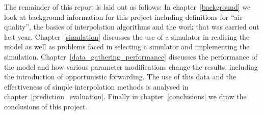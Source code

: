 
    The remainder of this report is laid out as follows: In chapter~\ref{background} we look at background information for this project including definitions for ``air quality'', the basics of interpolation algorithms and the work that was carried out last year. Chapter~\ref{simulation} discusses the use of a simulator in realising the model as well as problems faced in selecting a simulator and implementing the simulation. Chapter~\ref{data_gathering_performance} discusses the performance of the model and how various parameter modifications change the results, including the introduction of opportunistic forwarding. The use of this data and the effectiveness of simple interpolation methods is analysed in chapter~\ref{prediction_evaluation}. Finally in chapter~\ref{conclusions} we draw the conclusions of this project.
